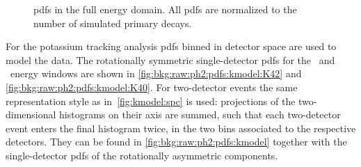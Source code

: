 \begin{figure}
  \centering
    \hspace{10pt}
  \caption{%
    pdfs in the full energy domain. All pdfs are normalized to the
    number of simulated primary decays.
  }\label{fig:bkg:raw:ph2:pdfs:gmodel2}
\end{figure}

For the potassium tracking analysis pdfs binned in detector space are
used to model the data. The rotationally symmetric single-detector pdfs
for the \kvn\ and \kvz\ energy windows are shown in
\cref{fig:bkg:raw:ph2:pdfs:kmodel:K42} and
\cref{fig:bkg:raw:ph2:pdfs:kmodel:K40}.  For two-detector events the
same representation style as in~\cref{fig:kmodel:spc} is used:
projections of the two-dimensional histograms on their axis are summed,
such that each two-detector event enters the final histogram twice, in
the two bins associated to the respective detectors. They can be found
in \cref{fig:bkg:raw:ph2:pdfs:kmodel} together with the single-detector
pdfs of the rotationally asymmetric components. 

